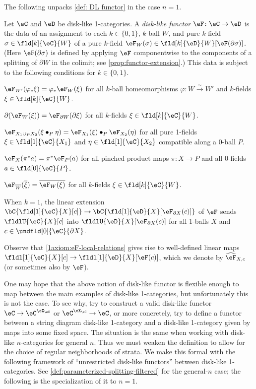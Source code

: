 \documentclass[12pt,reqno]{amsart}
\newcommand{\C}{\eC}
\newcommand{\D}{\eD}
\newcommand{\blt}{\bullet}
\newcommand{\fcj}[1]{\overline{#1}}
\newcommand{\orev}{\overline}
\newcommand{\defn}[1]{\emph{#1}}
\begin{document}
The following unpacks \cref{def: DL functor} in the case $n=1$.
\begin{definition}
\label{def: DL functor1}
Let $\eC$ and $\D$ be disk-like 1-categories. A \defn{disk-like functor} $\eF\colon\eC\to\D$ is the data of an assignment to each $k\in\{0,1\}$, $k$-ball $W$, and pure $k$-field $\sigma\in\fld[k]{\C}{W}$ of a pure $k$-field $\eF_W(\sigma)\in\fld[k]{\D}{W}[\eF(\partial \sigma)]$. (Here $\eF(\partial \sigma)$ is defined by applying $\eF$ componentwise to the components of a splitting of $\partial W$ in the colimit; see \cref{prop:functor-extension}.) This data is subject to the following conditions for $k\in\{0,1\}$.
\begin{lst}
\item[($\eF\varphi$)]\label{1axiom:eF-nat}
$\eF_{W'}(\varphi_*\xi)=\varphi_*\eF_W(\xi)$ for all $k$-ball homeomorphisms $\varphi\colon W\overset\sim\to W'$ and $k$-fields $\xi\in\fld[k]{\C}{W}$.
\item[($\eF\partial$)]\label{1axiom:eF-boundary} 
$\partial(\eF_W(\xi)) = \eF_{\partial W}(\partial \xi)$ for all $k$-fields $\xi\in\fld[k]{\C}{W}$.
\item[($\eF$G)]\label{1axiom:eF-gluing} 
$\eF_{X_1\cup_P X_2}(\xi\blt_P \eta) = \eF_{X_1}(\xi)\blt_P \eF_{X_2}(\eta)$ for all pure 1-fields $\xi\in\fld[1]{\C}{X_1}$ and $\eta\in\fld[1]{\C}{X_2}$ compatible along a 0-ball $P$.
\item[($\eF\pi$)]\label{1axiom:eF-products} 
$\eF_X(\pi^*a) = \pi^* \eF_P(a)$ for all pinched product maps $\pi \colon X \to P$ and all 0-fields $a\in\fld[0]{\C}{P}$.
\item[($\eF\kern.2ex\fcj{\,\cdot\,}$)]\label{1axiom:eF-refl}
$\eF_{\orev{W}}(\fcj{\xi}) = \fcj{\eF_W(\xi)}$ for all $k$-fields $\xi\in\fld[k]{\C}{W}$.
\item[($\eF$U)]\label{1axiom:eF-local-relations} 
When $k=1$, the linear extension $\bC\{\fld[1]{\C}{X}[ c]\} \to \bC\{\fld[1]{\D}{X}[ \eF_{\partial X}(c)]\}$ of $\eF$ sends $\fldlU{\C}{X}[c]$ into $\fldlU{\D}{X}[ \eF_{\partial X}(c)]$ for all 1-balls $X$ and $c\in\undfld[0]{\C}{\partial X}$.
\end{lst}
Observe that \ref{1axiom:eF-local-relations} gives rise to well-defined linear maps $\fldl[1]{\C}{X}[c]\to\fldl[1]{\D}{X}[\eF(c)]$, which we denote by $\widehat\eF_{X,c}$ (or sometimes also by $\eF$).
\end{definition}


One may hope that the above notion of disk-like functor is flexible enough to map between the main examples of disk-like 1-categories, but unfortunately this is not the case. To see why, try to construct a valid disk-like functor $\C\to\C^{\cX_\C}$ or $\C^{\cX_\C}\to\C$, or more concretely, try to define a functor between a string diagram disk-like 1-category and a disk-like 1-category given by maps into some fixed space. The situation is the same when working with disk-like $n$-categories for general $n$. Thus we must weaken the definition to allow for the choice of regular neighborhoods of strata. We make this formal with the following framework of ``unrestricted disk-like functors'' between disk-like 1-categories. See \cref{def:parameterized-splitting-filtered} for the general-$n$ case; the following is the specialization of it to $n=1$.
\end{document}
